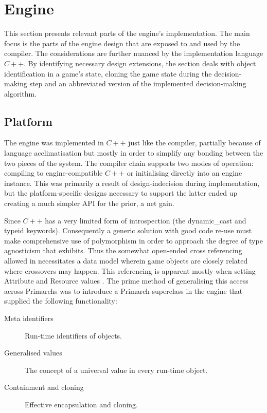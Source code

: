 \section{Engine}
This section presents relevant parts of the engine's implementation. The main focus is the parts of the engine design that are exposed to and used by the compiler. The considerations are further nuanced by the implementation language $C++$. By identifying necessary design extensions, the section deals with object identification in a game's state, cloning the game state during the decision-making step and an abbreviated version of the implemented decision-making algorithm.

\subsection{Platform}
The engine was implemented in $C++$ just like the compiler, partially because of language acclimatisation but mostly in order to simplify any bonding between the two pieces of the system. The compiler chain supports two modes of operation: compiling to engine-compatible $C++$ or initialising directly into an engine instance. This was primarily a result of design-indecision during implementation, but the platform-specific designs necessary to support the latter ended up creating a much simpler API for the prior, a net gain.

Since $C++$ has a very limited form of introspection (the dynamic\_cast and typeid keywords). Consequently a generic solution with good code re-use must make comprehensive use of polymorphism in order to approach the degree of type agnosticism that \langname{} exhibits. Thus the somewhat open-ended cross referencing allowed in \langname{} necessitates a data model wherein game objects are closely related where crossovers may happen. This referencing is apparent mostly when setting Attribute and Resource values . The prime method of generalising this access across Primarchs was to introduce a Primarch superclass in the engine that supplied the following functionality:
\begin{description}
	\item[Meta identifiers] Run-time identifiers of objects.
	\item[Generalised values] The concept of a universal value in every run-time object.
	\item[Containment and cloning] Effective encapsulation and cloning.
\end{description}

